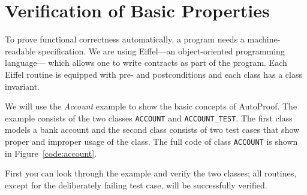 \documentclass[a4paper,12pt]{article}
\newcommand{\AutoProof}{Auto\-Proof\xspace}
\newcommand{\e}[1]{\mbox{\lstinline[language=Eiffel]|#1|}}
\begin{document}
\newpage
\tableofcontents

\newpage{}
\section{Verification of Basic Properties}

To prove functional correctness automatically, a program needs a machine-readable specification. We are using Eiffel---an object-oriented programming language--- which allows one to write contracts as part of the program. Each Eiffel routine is equipped with pre- and postconditions and each class has a class invariant.

We will use the \emph{Account} example to show the basic concepts of \AutoProof. The example consists of the two classes \e{ACCOUNT} and \e{ACCOUNT_TEST}. The first class models a bank account and the second class consists of two test cases that show proper and improper usage of the class. The full code of class \e{ACCOUNT} is shown in Figure~\ref{code:account}. 

First you can look through the example and verify the two classes; all routines, except for the deliberately failing test case, will be successfully verified.
\end{document}
